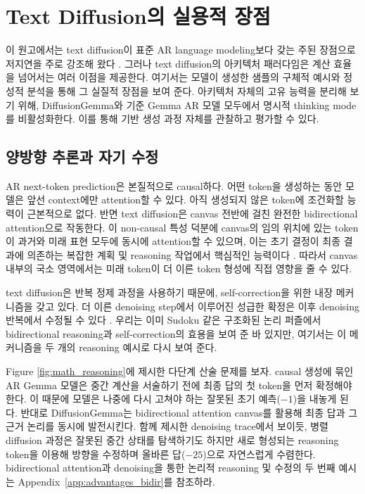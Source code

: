 \documentclass[11pt, a4paper, logo, copyright, gdm]{google}
\begin{document}
\section{Text Diffusion의 실용적 장점}\label{sec:advantages}

이 원고에서는 text diffusion이 표준 AR language modeling보다 갖는 주된 장점으로 저지연을 주로 강조해 왔다 \citep{ghazvininejad2019mask, gong2022diffuseq, li2022diffusionlm, dieleman2022continuous}. 그러나 text diffusion의 아키텍처 패러다임은 계산 효율을 넘어서는 여러 이점을 제공한다. 여기서는 모델이 생성한 샘플의 구체적 예시와 정성적 분석을 통해 그 실질적 장점을 보여 준다. 아키텍처 자체의 고유 능력을 분리해 보기 위해, DiffusionGemma와 기준 Gemma AR 모델 모두에서 명시적 thinking mode를 비활성화한다. 이를 통해 기반 생성 과정 자체를 관찰하고 평가할 수 있다.


\subsection{양방향 추론과 자기 수정}
AR next-token prediction은 본질적으로 causal하다. 어떤 token을 생성하는 동안 모델은 앞선 context에만 attention할 수 있다. 아직 생성되지 않은 token에 조건화할 능력이 근본적으로 없다. 반면 text diffusion은 canvas 전반에 걸친 완전한 bidirectional attention으로 작동한다. 이 non-causal 특성 덕분에 canvas의 임의 위치에 있는 token이 과거와 미래 표현 모두에 동시에 attention할 수 있으며, 이는 초기 결정이 최종 결과에 의존하는 복잡한 계획 및 reasoning 작업에서 핵심적인 능력이다 \citep[e.g.,][]{papadopoulos2024arrows, kitouni2024factorization, zhangli2024reverse, nagarajan2025roll}. 따라서 canvas 내부의 국소 영역에서는 미래 token이 더 이른 token 형성에 직접 영향을 줄 수 있다.

text diffusion은 반복 정제 과정을 사용하기 때문에, self-correction을 위한 내장 메커니즘을 갖고 있다. 더 이른 denoising step에서 이루어진 성급한 확정은 이후 denoising 반복에서 수정될 수 있다 \citep{reid2022diffuser, han2023ssdlm}. 우리는 이미 Sudoku 같은 구조화된 논리 퍼즐에서 bidirectional reasoning과 self-correction의 효용을 보여 준 바 있지만, 여기서는 이 메커니즘을 두 개의 reasoning 예시로 다시 보여 준다.

Figure \ref{fig:math_reasoning}에 제시한 다단계 산술 문제를 보자. causal 생성에 묶인 AR Gemma 모델은 중간 계산을 서술하기 전에 최종 답의 첫 token을 먼저 확정해야 한다. 이 때문에 모델은 나중에 다시 고쳐야 하는 잘못된 초기 예측($-1$)을 내놓게 된다. 반대로 DiffusionGemma는 bidirectional attention canvas를 활용해 최종 답과 그 근거 논리를 동시에 발전시킨다. 함께 제시한 denoising trace에서 보이듯, 병렬 diffusion 과정은 잘못된 중간 상태를 탐색하기도 하지만 새로 형성되는 reasoning token을 이용해 방향을 수정하며 올바른 답($-25$)으로 자연스럽게 수렴한다. bidirectional attention과 denoising을 통한 논리적 reasoning 및 수정의 두 번째 예시는 Appendix~\ref{app:advantages_bidir}를 참조하라.
\end{document}
